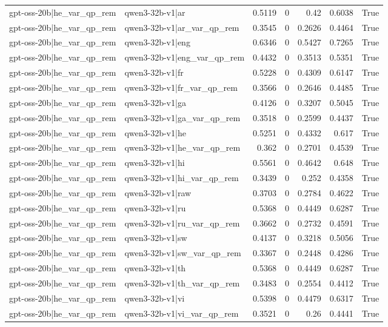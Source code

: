 \begin{table}
\begin{tabular}{l l r r r r l}
gpt-oss-20b|he_var_qp_rem & qwen3-32b-v1|ar & 0.5119 & 0 & 0.42 & 0.6038 & True \\
gpt-oss-20b|he_var_qp_rem & qwen3-32b-v1|ar_var_qp_rem & 0.3545 & 0 & 0.2626 & 0.4464 & True \\
gpt-oss-20b|he_var_qp_rem & qwen3-32b-v1|eng & 0.6346 & 0 & 0.5427 & 0.7265 & True \\
gpt-oss-20b|he_var_qp_rem & qwen3-32b-v1|eng_var_qp_rem & 0.4432 & 0 & 0.3513 & 0.5351 & True \\
gpt-oss-20b|he_var_qp_rem & qwen3-32b-v1|fr & 0.5228 & 0 & 0.4309 & 0.6147 & True \\
gpt-oss-20b|he_var_qp_rem & qwen3-32b-v1|fr_var_qp_rem & 0.3566 & 0 & 0.2646 & 0.4485 & True \\
gpt-oss-20b|he_var_qp_rem & qwen3-32b-v1|ga & 0.4126 & 0 & 0.3207 & 0.5045 & True \\
gpt-oss-20b|he_var_qp_rem & qwen3-32b-v1|ga_var_qp_rem & 0.3518 & 0 & 0.2599 & 0.4437 & True \\
gpt-oss-20b|he_var_qp_rem & qwen3-32b-v1|he & 0.5251 & 0 & 0.4332 & 0.617 & True \\
gpt-oss-20b|he_var_qp_rem & qwen3-32b-v1|he_var_qp_rem & 0.362 & 0 & 0.2701 & 0.4539 & True \\
gpt-oss-20b|he_var_qp_rem & qwen3-32b-v1|hi & 0.5561 & 0 & 0.4642 & 0.648 & True \\
gpt-oss-20b|he_var_qp_rem & qwen3-32b-v1|hi_var_qp_rem & 0.3439 & 0 & 0.252 & 0.4358 & True \\
gpt-oss-20b|he_var_qp_rem & qwen3-32b-v1|raw & 0.3703 & 0 & 0.2784 & 0.4622 & True \\
gpt-oss-20b|he_var_qp_rem & qwen3-32b-v1|ru & 0.5368 & 0 & 0.4449 & 0.6287 & True \\
gpt-oss-20b|he_var_qp_rem & qwen3-32b-v1|ru_var_qp_rem & 0.3662 & 0 & 0.2732 & 0.4591 & True \\
gpt-oss-20b|he_var_qp_rem & qwen3-32b-v1|sw & 0.4137 & 0 & 0.3218 & 0.5056 & True \\
gpt-oss-20b|he_var_qp_rem & qwen3-32b-v1|sw_var_qp_rem & 0.3367 & 0 & 0.2448 & 0.4286 & True \\
gpt-oss-20b|he_var_qp_rem & qwen3-32b-v1|th & 0.5368 & 0 & 0.4449 & 0.6287 & True \\
gpt-oss-20b|he_var_qp_rem & qwen3-32b-v1|th_var_qp_rem & 0.3483 & 0 & 0.2554 & 0.4412 & True \\
gpt-oss-20b|he_var_qp_rem & qwen3-32b-v1|vi & 0.5398 & 0 & 0.4479 & 0.6317 & True \\
gpt-oss-20b|he_var_qp_rem & qwen3-32b-v1|vi_var_qp_rem & 0.3521 & 0 & 0.26 & 0.4441 & True \\

\end{tabular}
\end{table}
